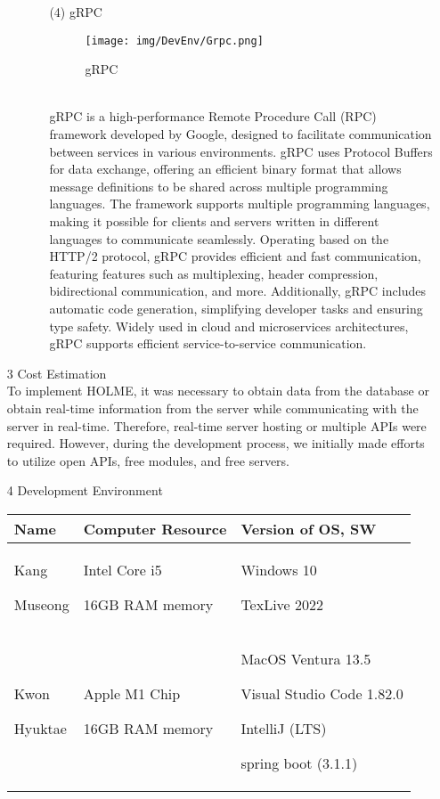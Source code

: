 \documentclass[conference]{IEEEtran}
\begin{document}
\begin{enumerate}
\begin{itemize}
\begin{itemize}
\item [(4)] gRPC\cite{gRPC}\\
\begin{figure}[h]
\centering
\texttt{[image: img/DevEnv/Grpc.png]}
\caption{gRPC} 
\end{figure}\\
gRPC is a high-performance Remote Procedure Call (RPC) framework developed by Google, designed to facilitate communication between services in various environments. gRPC uses Protocol Buffers for data exchange, offering an efficient binary format that allows message definitions to be shared across multiple programming languages. The framework supports multiple programming languages, making it possible for clients and servers written in different languages to communicate seamlessly. Operating based on the HTTP/2 protocol, gRPC provides efficient and fast communication, featuring features such as multiplexing, header compression, bidirectional communication, and more. Additionally, gRPC includes automatic code generation, simplifying developer tasks and ensuring type safety. Widely used in cloud and microservices architectures, gRPC supports efficient service-to-service communication.\\
\end{itemize}
\end{itemize}

\item[3] Cost Estimation\\
To implement HOLME, it was necessary to obtain data from the database or obtain real-time information from the server while communicating with the server in real-time. Therefore, real-time server hosting or multiple APIs were required. However, during the development process, we initially made efforts to utilize open APIs, free modules, and free servers.\\

\item[4] Development Environment
\begin{table}[h]
\def\arraystretch{1.24} \small
    \begin{tabular}{|p{1.2cm}|p{3.0cm}|p{3.6cm}|}
        \hline
        Name & Computer Resource & Version of OS, SW\\ \hline
         Kang \par Museong & Intel Core i5\par 16GB RAM memory & Windows 10 \par TexLive 2022 \\ \hline
        Kwon \par Hyuktae & Apple M1 Chip \par 16GB RAM memory & MacOS Ventura 13.5 \par Visual Studio Code 1.82.0 \par IntelliJ (LTS)\par spring boot (3.1.1) \\ \hline
        

\end{tabular}
\end{table}
\end{enumerate}
\end{document}

